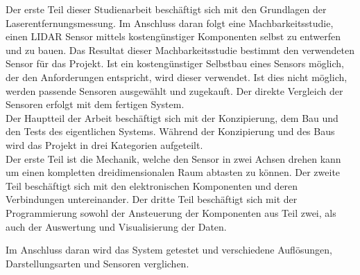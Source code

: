 Der erste Teil dieser Studienarbeit beschäftigt sich mit den Grundlagen der Laserentfernungsmessung. Im Anschluss daran folgt eine Machbarkeitsstudie, einen \ac{LIDAR} Sensor mittels kostengünstiger Komponenten selbst zu entwerfen und zu bauen. Das Resultat dieser Machbarkeitsstudie bestimmt den verwendeten Sensor für das Projekt. Ist ein kostengünstiger Selbstbau eines Sensors möglich, der den Anforderungen entspricht, wird dieser verwendet. Ist dies nicht möglich, werden passende Sensoren ausgewählt und zugekauft. Der direkte Vergleich der Sensoren erfolgt mit dem fertigen System.\\
Der Hauptteil der Arbeit beschäftigt sich mit der Konzipierung, dem Bau und den Tests des eigentlichen Systems. Während der Konzipierung und des Baus wird das Projekt in drei Kategorien aufgeteilt.\\
Der erste Teil ist die Mechanik, welche den Sensor in zwei Achsen drehen kann um einen kompletten dreidimensionalen Raum abtasten zu können. Der zweite Teil beschäftigt sich mit den elektronischen Komponenten und deren Verbindungen untereinander. Der dritte Teil beschäftigt sich mit der Programmierung sowohl der Ansteuerung der Komponenten aus Teil zwei, als auch der Auswertung und Visualisierung der Daten.

Im Anschluss daran wird das System getestet und verschiedene Auflösungen, Darstellungsarten und Sensoren verglichen.
